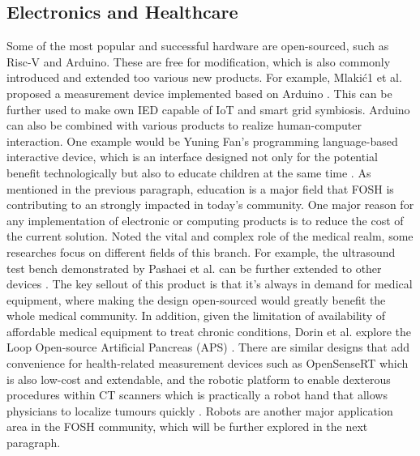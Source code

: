 \documentclass[final-report.tex]{subfiles}
\begin{document}
\subsection{Electronics and Healthcare}
Some of the most popular and successful hardware are open-sourced, such as Risc-V and Arduino. 
These are free for modification, which is also commonly introduced and extended too various new products. 
For example, Mlakić1 et al. proposed a measurement device implemented based on Arduino \cite{mlakic2019open}. This can be further used to make own IED capable of IoT and smart grid symbiosis. Arduino can also be combined with various products to realize human-computer interaction. 
One example would be Yuning Fan's programming language-based interactive device, which is an interface designed not only for the potential benefit technologically but also to educate children at the same time \cite{fan2021open}. 
As mentioned in the previous paragraph, education is a major field that FOSH is contributing to an strongly impacted in today's community.  
One major reason for any implementation of electronic or computing products is to reduce the cost of the current solution. Noted the vital and complex role of the medical realm, some researches  focus on different fields of this branch. 
For example, the ultrasound test bench demonstrated by Pashaei et al. can be further extended to other devices \cite{pashaei2018live}. 
The key sellout of this product is that it's always in demand for medical equipment, where making the design open-sourced would greatly benefit the whole medical community. 
In addition, given the limitation of availability of affordable medical equipment to treat chronic conditions, Dorin et al. explore the Loop Open-source Artificial Pancreas (APS) \cite{dorin2020open}.
There are similar designs that add convenience for health-related measurement devices such as OpenSenseRT which is also low-cost and extendable, and the robotic platform to enable dexterous procedures within CT scanners which is practically a robot hand that allows physicians to localize tumours quickly \cite{slade2021open}. Robots are another major application area in the FOSH community, which will be further explored in the next paragraph. 
\end{document}
